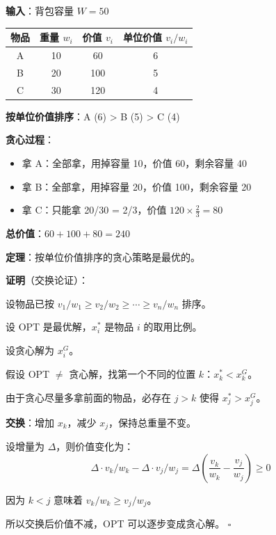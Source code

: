 \documentclass[12pt, a4paper]{ctexart}
\begin{document}
\begin{blackboard}[分数背包例子]

\textbf{输入}：背包容量 $W = 50$

\begin{center}
\begin{tabular}{c|ccc}
物品 & 重量 $w_i$ & 价值 $v_i$ & 单位价值 $v_i/w_i$ \\
\hline
A & 10 & 60 & 6 \\
B & 20 & 100 & 5 \\
C & 30 & 120 & 4 \\
\end{tabular}
\end{center}

\textbf{按单位价值排序}：A (6) > B (5) > C (4)

\textbf{贪心过程}：
\begin{itemize}
    \item 拿 A：全部拿，用掉容量 10，价值 60，剩余容量 40
    \item 拿 B：全部拿，用掉容量 20，价值 100，剩余容量 20
    \item 拿 C：只能拿 20/30 = 2/3，价值 $120 \times \frac{2}{3} = 80$
\end{itemize}

\textbf{总价值}：$60 + 100 + 80 = 240$

\end{blackboard}

\begin{blackboard}[分数背包贪心正确性证明]

\textbf{定理}：按单位价值排序的贪心策略是最优的。

\textbf{证明}（交换论证）：

设物品已按 $v_1/w_1 \geq v_2/w_2 \geq \cdots \geq v_n/w_n$ 排序。

设 OPT 是最优解，$x_i^*$ 是物品 $i$ 的取用比例。

设贪心解为 $x_i^G$。

假设 OPT $\neq$ 贪心解，找第一个不同的位置 $k$：$x_k^* < x_k^G$。

由于贪心尽量多拿前面的物品，必存在 $j > k$ 使得 $x_j^* > x_j^G$。

\textbf{交换}：增加 $x_k$，减少 $x_j$，保持总重量不变。

设增量为 $\Delta$，则价值变化为：
\[
\Delta \cdot v_k / w_k - \Delta \cdot v_j / w_j = \Delta \left( \frac{v_k}{w_k} - \frac{v_j}{w_j} \right) \geq 0
\]

因为 $k < j$ 意味着 $v_k/w_k \geq v_j/w_j$。

所以交换后价值不减，OPT 可以逐步变成贪心解。 $\square$

\end{blackboard}
\end{document}
